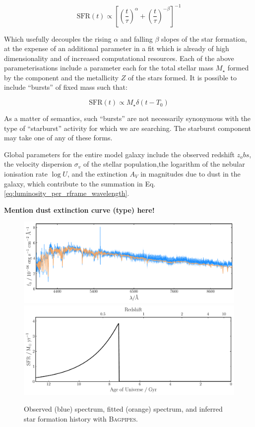 \documentclass[a4paper,11pt]{article}
\begin{document}
\begin{equation}\label{eq:dblplaw_model}
  \mathrm{SFR}(t)\propto
  \left[
  \left(\frac{t}{\tau}\right)^{\alpha} +
  \left(\frac{t}{\tau}\right)^{-\beta}
  \right]
  ^{-1}
\end{equation}

\noindent Which usefully decouples the rising $\alpha$ and falling $\beta$ slopes of the star formation, at the expense of an additional parameter in a fit which is already of high dimensionality and of increased computational resources.\cite{Carnall_2018} Each of the above parameterisations include a parameter each for the total stellar mass $M_\star$ formed by the component and the metallicity $Z$ of the stars formed. It is possible to include ``bursts'' of fixed mass such that:

\begin{equation}\label{eq:burst_model}
  \mathrm{SFR}(t)\propto
  M_\star \delta(t-T_0)
\end{equation}

\noindent As a matter of semantics, such ``bursts'' are not necessarily synonymous with the type of ``starburst'' activity for which we are searching. The starburst component may take one of any of these forms.

Global parameters for the entire model galaxy include the observed redshift $z_obs$, the velocity dispersion $\sigma_v$ of the stellar population,the logarithm of the nebular ionisation rate $\log{U}$, and the extinction $A_V$ in magnitudes due to dust in the galaxy, which contribute to the summation in Eq. \ref{eq:luminosity_per_rframe_wavelength}.

\textbf{Mention dust extinction curve (type) here!}

\begin{figure}
  \includegraphics[width=\textwidth]{host_hyz_specwerr_fit}
  \includegraphics[width=\textwidth]{host_hyz_specwerr_sfh}
  \caption{Observed (blue) spectrum, fitted (orange) spectrum, and inferred star formation history with \textsc{Bagpipes}.}
  \label{fig:bagpipes_example_fit}
\end{figure}
\end{document}
